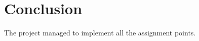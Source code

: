 \documentclass[a4paper, 11pt, a4paper]{article}
\begin{document}
\section{Conclusion}

The project managed to implement all the assignment points.



\newpage


\renewcommand{\refname}{Literature}

\end{document}
